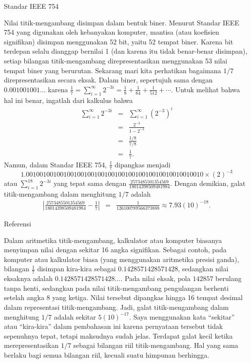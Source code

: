 \noindent\begin{digression}{Standar IEEE 754}

\noindent Nilai titik-mengambang
disimpan dalam bentuk biner. Menurut Standar IEEE 754 yang digunakan
oleh kebanyakan komputer, mantisa (atau koefisien signifikan) disimpan
menggunakan 52 bit, yaitu 52 tempat biner. Karena bit terdepan selalu
dianggap bernilai 1 (dan karena itu tidak benar-benar disimpan), setiap
bilangan titik-mengambang direpresentasikan menggunakan 53 nilai tempat
biner yang berurutan. Sekarang mari kita perhatikan bagaimana $1/7$
direpresentasikan secara eksak. Dalam biner, sepertujuh sama dengan
$0.001001001\ldots$ karena $\frac{1}{7}=\sum_{i=1}^{\infty}2^{-3i}=\frac{1}{8}+\frac{1}{64}+\frac{1}{512}+\cdots$.
Untuk melihat bahwa hal ini benar, ingatlah dari kalkulus bahwa
\begin{eqnarray*}
\sum_{i=1}^{\infty}2^{-3i} & = & \sum_{i=1}^{\infty}\left(2^{-3}\right)^{i}\\
 & = & \frac{2^{-3}}{1-2^{-3}}\\
 & = & \frac{1/8}{7/8}\\
 & = & \frac{1}{7}.
\end{eqnarray*}
Namun, dalam Standar IEEE 754, $\frac{1}{7}$ dipangkas menjadi
\[
1.0010010010010010010010010010010010010010010010010010\times(2)^{-3}
\]
atau $\sum_{i=1}^{18}2^{-3i}$ yang tepat sama dengan $\frac{2573485501354569}{18014398509481984}$.
Dengan demikian, galat titik-mengambang dalam menghitung $1/7$ adalah
\begin{eqnarray*}
\left|\frac{2573485501354569}{18014398509481984}-\frac{1}{7}\right| & = & \frac{1}{126100789566373888}\approx7.93(10)^{-18}.
\end{eqnarray*}

\begin{description}
\item [{Referensi}] \cite{cunyieee754,goldberg}
\end{description}
\noindent\end{digression} 

Dalam aritmetika titik-mengambang, kalkulator atau komputer biasanya
menyimpan nilai dengan sekitar 16 angka signifikan. Sebagai contoh,
pada komputer atau kalkulator biasa (yang menggunakan aritmetika presisi
ganda), bilangan $\frac{1}{7}$ disimpan kira-kira sebagai $0.1428571428571428$,
sedangkan nilai eksaknya adalah $0.1428571428571428\ldots$. Pada
nilai eksak, pola $142857$ berulang tanpa henti, sedangkan pada nilai
titik-mengambang pengulangan berhenti setelah angka 8 yang ketiga.
Nilai tersebut dipangkas hingga 16 tempat desimal dalam representasi
titik-mengambang. Jadi, galat titik-mengambang dalam menghitung $1/7$
adalah sekitar $5(10)^{-17}$. Saya menggunakan kata ``sekitar''
atau ``kira-kira'' dalam pembahasan ini karena pernyataan tersebut
tidak sepenuhnya tepat, tetapi maksudnya sudah jelas. Terdapat galat
kecil ketika merepresentasikan $1/7$ sebagai bilangan riil titik-mengambang.
Hal yang sama berlaku bagi semua bilangan riil, kecuali suatu himpunan
berhingga.

